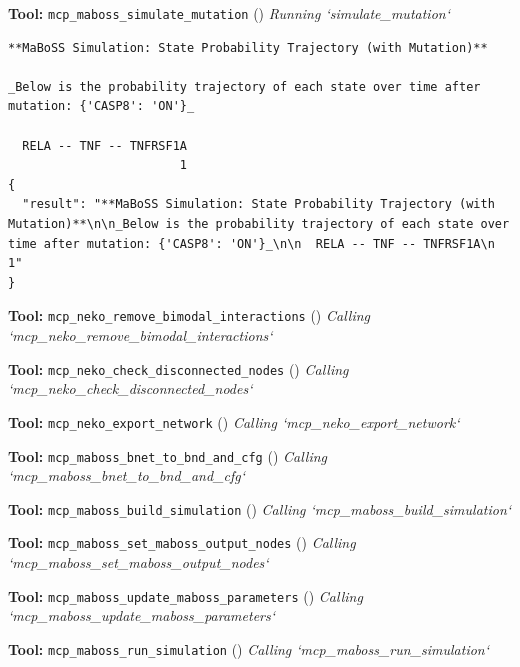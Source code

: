 \documentclass[11pt,a4paper]{article}
\begin{document}
\begin{toolokbox}
\textbf{Tool:} \texttt{mcp\_maboss\_simulate\_mutation} (\checkmark)
\textit{Running `simulate\_mutation`}
\begin{lstlisting}
**MaBoSS Simulation: State Probability Trajectory (with Mutation)**

_Below is the probability trajectory of each state over time after mutation: {'CASP8': 'ON'}_

  RELA -- TNF -- TNFRSF1A
                        1
{
  "result": "**MaBoSS Simulation: State Probability Trajectory (with Mutation)**\n\n_Below is the probability trajectory of each state over time after mutation: {'CASP8': 'ON'}_\n\n  RELA -- TNF -- TNFRSF1A\n                        1"
}
\end{lstlisting}
\end{toolokbox}
\begin{toolokbox}
\textbf{Tool:} \texttt{mcp\_neko\_remove\_bimodal\_interactions} (\checkmark)
\textit{Calling `mcp\_neko\_remove\_bimodal\_interactions`}
\end{toolokbox}
\begin{toolokbox}
\textbf{Tool:} \texttt{mcp\_neko\_check\_disconnected\_nodes} (\checkmark)
\textit{Calling `mcp\_neko\_check\_disconnected\_nodes`}
\end{toolokbox}
\begin{toolokbox}
\textbf{Tool:} \texttt{mcp\_neko\_export\_network} (\checkmark)
\textit{Calling `mcp\_neko\_export\_network`}
\end{toolokbox}
\begin{toolokbox}
\textbf{Tool:} \texttt{mcp\_maboss\_bnet\_to\_bnd\_and\_cfg} (\checkmark)
\textit{Calling `mcp\_maboss\_bnet\_to\_bnd\_and\_cfg`}
\end{toolokbox}
\begin{toolokbox}
\textbf{Tool:} \texttt{mcp\_maboss\_build\_simulation} (\checkmark)
\textit{Calling `mcp\_maboss\_build\_simulation`}
\end{toolokbox}
\begin{toolokbox}
\textbf{Tool:} \texttt{mcp\_maboss\_set\_maboss\_output\_nodes} (\checkmark)
\textit{Calling `mcp\_maboss\_set\_maboss\_output\_nodes`}
\end{toolokbox}
\begin{toolokbox}
\textbf{Tool:} \texttt{mcp\_maboss\_update\_maboss\_parameters} (\checkmark)
\textit{Calling `mcp\_maboss\_update\_maboss\_parameters`}
\end{toolokbox}
\begin{toolokbox}
\textbf{Tool:} \texttt{mcp\_maboss\_run\_simulation} (\checkmark)
\textit{Calling `mcp\_maboss\_run\_simulation`}
\end{toolokbox}
\end{document}
